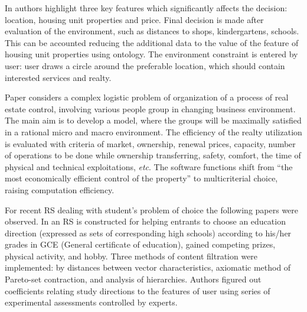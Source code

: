 \documentclass[conference,a4]{IEEEtran}
\begin{document}
In \cite{br23} authors highlight three key features which significantly affects the decision: location, housing unit properties and price.  Final decision is made after evaluation of the environment, such as distances to shops, kindergartens, schools.  This can be accounted reducing the additional data to the value of the feature of housing unit properties using ontology.  The environment constraint is entered by user: user draws a circle around the preferable location, which should contain interested services and realty.

Paper \cite{br21} considers a complex logistic problem of organization of a process of real estate control, involving various people group in changing business environment.  The main aim is to develop a model, where the groups will be maximally satisfied in a rational micro and macro environment.  The efficiency of the realty utilization is evaluated with criteria of market, ownership, renewal prices, capacity, number of operations to be done while ownership transferring, safety, comfort, the time of physical and technical exploitations, \emph{etc}.  The software functions shift from ``the most economically efficient control of the property'' to multicriterial choice, raising computation efficiency.


For recent RS dealing with student's problem of choice the following papers were observed. In \cite{belotsky} an RS is constructed for helping entrants to choose an education direction (expressed as sets of corresponding high schools) according to his/her grades in GCE (General certificate of education), gained competing prizes, physical activity, and hobby.  Three methods of content filtration were implemented: by distances between vector characteristics, axiomatic method of Pareto-set contraction, and analysis of hierarchies.  Authors figured out coefficients relating study directions to the features of user using series of experimental assessments controlled by experts.
\end{document}
